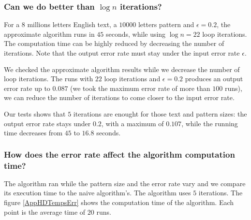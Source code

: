 \documentclass[preprint,12pt]{elsarticle}
\begin{document}





\subsubsection*{Can we do better than $\log n$ iterations?}
\label{AppIter}

For a $8$ millions letters English text, a $10 000$ letters pattern and $\epsilon = 0.2$,
the approximate algorithm runs in  $45$ seconds,
while using $\log n = 22$ loop iterations.
The computation time can be highly reduced by decreasing the number of iterations.
Note that the output error rate must stay under the input error rate $\epsilon$.

We checked the approximate algorithm results
while we decrease the number of loop iterations. %
The runs with $22$ loop iterations and $\epsilon = 0.2$
produces an output error rate up to $0.087$
(we took the maximum error rate of more than $100$ runs),
we can reduce the number of iterations to come closer to the input error rate.

Our tests shows that $5$ iterations are enought
for those text and pattern sizes: the output error rate stays under $0.2$,
with a maximum of $0.107$, %
while the running time decreases from $45$ to $16.8$ seconds.

 

\subsubsection*{How does the error rate affect the algorithm computation time?}

The algorithm ran while the pattern size and the error rate vary
and we compare its execution time to the naive algorithm's.
The algorithm uses $5$ iterations.
The figure \ref{AppHDTempsErr} shows the computation time of the algorithm.
Each point is the average time of $20$ runs.
\end{document}
